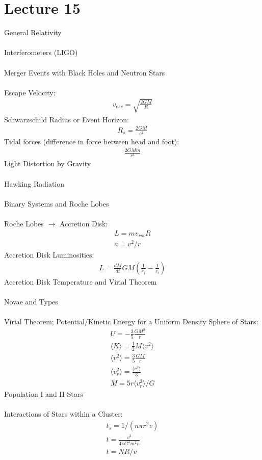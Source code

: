\documentclass[11pt,reqno]{article}
\theoremstyle{definition}
\begin{document}
\section*{Lecture 15}
General Relativity\\\\
Interferometers (LIGO)\\\\
Merger Events with Black Holes and Neutron Stars\\\\
Escape Velocity:
\begin{align*}
    v_{esc} = \sqrt{\frac{2GM}{R}}
\end{align*}
Schwarzschild Radius or Event Horizon:
\begin{align*}
    R_s = \frac{2GM}{c^2}
\end{align*}
Tidal forces (difference in force between head and foot):
\begin{align*}
    \frac{2GMm}{r^3}
\end{align*}
Light Distortion by Gravity\\\\
Hawking Radiation\\\\
Binary Systems and Roche Lobes\\\\
Roche Lobes $\rightarrow$ Accretion Disk:
\begin{align*}
    L = mv_{rot}R\\
    a = v^2 / r
\end{align*}
Accretion Disk Luminosities:
\begin{align*}
    L = \frac{dM}{dt}GM(\frac{1}{r_f}-\frac{1}{r_i})
\end{align*}
Accretion Disk Temperature and Virial Theorem\\\\
Novae and Types\\\\
Virial Theorem; Potential/Kinetic Energy for a Uniform Density Sphere of Stars:
\begin{align*}
    U = -\frac{3}{5}\frac{GM^2}{r}\\
    \langle K\rangle = \frac{1}{2} M\langle v^2\rangle\\
    \langle v^2\rangle = \frac{3}{5} \frac{GM}{r}\\
    \langle v_r^2\rangle = \frac{\langle v^2\rangle}{3}\\
    M = 5r\langle v_r^2\rangle / G
\end{align*}
Population I and II Stars\\\\
Interactions of Stars within a Cluster:
\begin{align*}
    t_s = 1 / (n\pi r^2 v)\\
    t = \frac{v^3}{4\pi G^2 m^2 n}\\
    t = NR/v
\end{align*}
\end{document}
